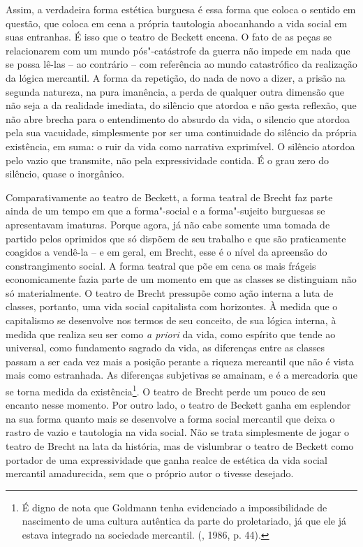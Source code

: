 Assim, a verdadeira forma estética burguesa é essa forma que coloca o
sentido em questão, que coloca em cena a própria tautologia abocanhando
a vida social em suas entranhas. É isso que o teatro de Beckett encena.
O fato de as peças se relacionarem com um mundo pós"-catástrofe da guerra
não impede em nada que se possa lê-las -- ao contrário -- com
referência ao mundo catastrófico da realização da lógica mercantil. A
forma da repetição, do nada de novo a dizer, a prisão na segunda
natureza, na pura imanência, a perda de qualquer outra dimensão que não
seja a da realidade imediata, do silêncio que atordoa e não gesta
reflexão, que não abre brecha para o entendimento do absurdo da vida, o
silencio que atordoa pela sua vacuidade, simplesmente por ser uma
continuidade do silêncio da própria existência, em suma: o ruir da vida
como narrativa exprimível. O silêncio atordoa pelo vazio que transmite,
não pela expressividade contida. É o grau zero do silêncio, quase o
inorgânico.

Comparativamente ao teatro de Beckett, a forma teatral de Brecht faz
parte ainda de um tempo em que a forma"-social e a forma"-sujeito
burguesas se apresentavam imaturas. Porque agora, já não cabe somente
uma tomada de partido pelos oprimidos que só dispõem de seu trabalho e
que são praticamente coagidos a vendê-la -- e em geral, em Brecht, esse
é o nível da apreensão do constrangimento social. A forma teatral que
põe em cena os mais frágeis economicamente fazia parte de um momento em
que as classes se distinguiam não só materialmente. O teatro de Brecht
pressupõe como ação interna a luta de classes, portanto, uma vida social
capitalista com horizontes. À medida que o capitalismo se desenvolve nos
termos de seu conceito, de sua lógica interna, à medida que realiza seu
ser como \emph{a priori} da vida, como espírito que tende ao universal,
como fundamento sagrado da vida, as diferenças entre as classes passam a
ser cada vez mais a posição perante a riqueza mercantil que não é vista
mais como estranhada. As diferenças subjetivas se amainam, e é a
mercadoria que se torna medida da existência\footnote{É digno de nota
  que Goldmann tenha evidenciado a impossibilidade de nascimento de uma
  cultura autêntica da parte do proletariado, já que ele já estava
  integrado na sociedade mercantil. (, 1986, p. 44).}. O teatro
de Brecht perde um pouco de seu encanto nesse momento. Por outro lado, o
teatro de Beckett ganha em esplendor na sua forma quanto mais se
desenvolve a forma social mercantil que deixa o rastro de vazio e
tautologia na vida social. Não se trata simplesmente de jogar o teatro
de Brecht na lata da história, mas de vislumbrar o teatro de Beckett
como portador de uma expressividade que ganha realce de estética da vida
social mercantil amadurecida, sem que o próprio autor o tivesse
desejado.

